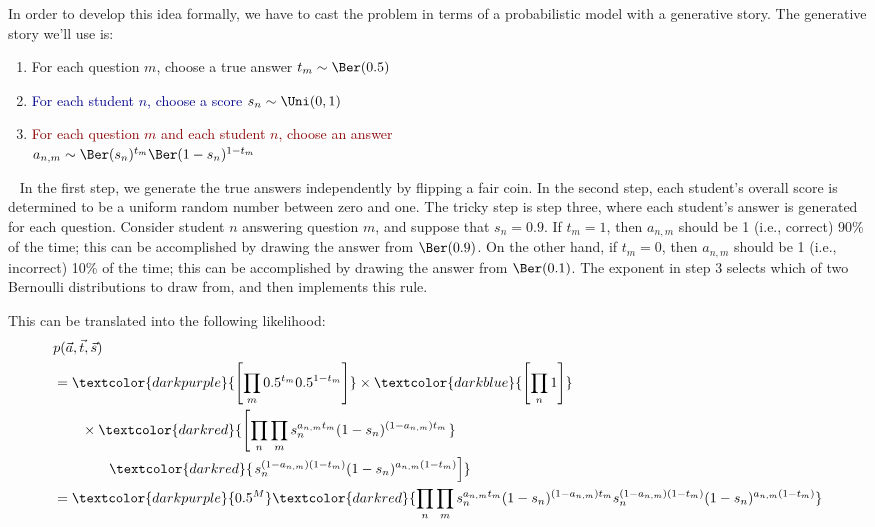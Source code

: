 In order to develop this idea formally, we have to cast the problem in terms of a probabilistic model with a generative story.
The generative story we'll use is:
%
\begin{enumerate}
  \item \textcolor{darkpurple}{For each question $m$, choose a true answer $t_m \sim \Ber(0.5)$}
  \item \textcolor{darkblue}{For each student $n$, choose a score $s_n \sim \Uni(0,1)$}
  \item \textcolor{darkred}{For each question $m$ and each student $n$, choose an answer\\ $a_{n,m} \sim \Ber(s_n)^{t_m}  \Ber(1-s_n)^{1-t_m}$}
\end{enumerate}
~
In the first step, we generate the true answers independently by flipping a fair coin.
In the second step, each student's overall score is determined to be a uniform random number between zero and one.
The tricky step is step three, where each student's answer is generated for each question.
Consider student $n$ answering question $m$, and suppose that $s_n = 0.9$.
If $t_m = 1$, then $a_{n,m}$ should be 1 (i.e., correct) 90\% of the time;
this can be accomplished by drawing the answer from $\Ber(0.9)$.
On the other hand, if $t_m = 0$, then $a_{n,m}$ should be 1 (i.e., incorrect) 10\% of the time;
this can be accomplished by drawing the answer from $\Ber(0.1)$.
The exponent in step 3 selects which of two Bernoulli distributions to draw from, and then implements this rule.

This can be translated into the following likelihood:
~
\begin{align}
  &p(\vec a, \vec t, \vec s) \nonumber\\
  &=      \textcolor{darkpurple}{\left[ \prod_m 0.5^{t_m} 0.5^{1-t_m} \right]} \times
            \textcolor{darkblue}{\left[ \prod_n 1 \right]} \nonumber\\
  &\qquad \times    \textcolor{darkred}{\left[ \prod_n\prod_m
    s_n^{a_{n,m}t_m}
    (1-s_n)^{(1-a_{n,m})t_m} \right.} \nonumber\\
  &\qquad\qquad\textcolor{darkred}{\left. s_n^{(1-a_{n,m})(1-t_m)}
    (1-s_n)^{a_{n,m}(1-t_m)}
    \right]} \\
 &= \textcolor{darkpurple}{0.5^M}
   \textcolor{darkred}{
\prod_n\prod_m
    s_n^{a_{n,m}t_m}
    (1-s_n)^{(1-a_{n,m})t_m}
   s_n^{(1-a_{n,m})(1-t_m)}
    (1-s_n)^{a_{n,m}(1-t_m)}
   }
\end{align}

